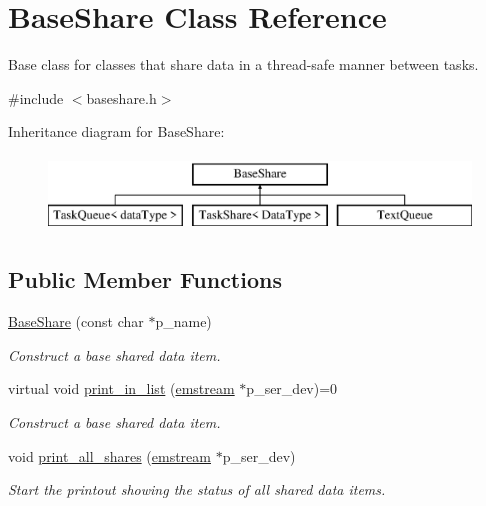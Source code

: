\hypertarget{class_base_share}{}\section{Base\+Share Class Reference}
\label{class_base_share}


Base class for classes that share data in a thread-\/safe manner between tasks.  




{\ttfamily \#include $<$baseshare.\+h$>$}

Inheritance diagram for Base\+Share\+:\begin{figure}[H]
\begin{center}
\leavevmode
\includegraphics[height=2.000000cm]{class_base_share}
\end{center}
\end{figure}
\subsection*{Public Member Functions}
\begin{DoxyCompactItemize}
\item 
\mbox{\hyperlink{class_base_share_a9b0cfde3e2ee1869a507e7b8552ccf37}{Base\+Share}} (const char $\ast$p\+\_\+name)
\begin{DoxyCompactList}\small\item\em Construct a base shared data item. \end{DoxyCompactList}\item 
virtual void \mbox{\hyperlink{class_base_share_a81ef685c8c1897ee316e853103e9941a}{print\+\_\+in\+\_\+list}} (\mbox{\hyperlink{classemstream}{emstream}} $\ast$p\+\_\+ser\+\_\+dev)=0
\begin{DoxyCompactList}\small\item\em Construct a base shared data item. \end{DoxyCompactList}\item 
void \mbox{\hyperlink{class_base_share_a0112f588e48414498d6d2f12db7b347f}{print\+\_\+all\+\_\+shares}} (\mbox{\hyperlink{classemstream}{emstream}} $\ast$p\+\_\+ser\+\_\+dev)
\begin{DoxyCompactList}\small\item\em Start the printout showing the status of all shared data items. \end{DoxyCompactList}\end{DoxyCompactItemize}
